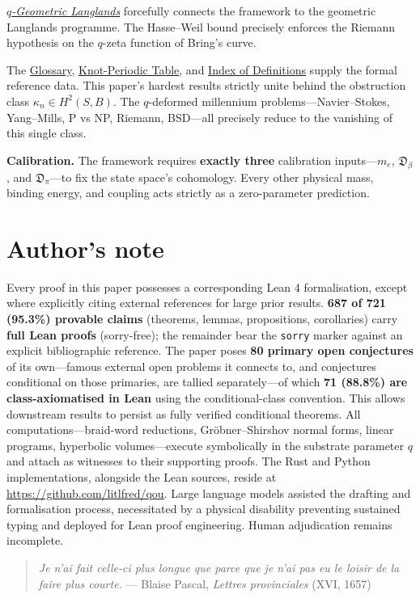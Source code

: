 \hyperref[chap:q-geometric-langlands]{\emph{$q$-Geometric Langlands}} forcefully connects the framework to the geometric Langlands programme. The Hasse–Weil bound precisely enforces the Riemann hypothesis on the $q$-zeta function of Bring's curve.

The \hyperref[chap:glossary]{Glossary}, \hyperref[app:knot-periodic-table]{Knot-Periodic Table}, and \hyperref[app:index-definitions]{Index of Definitions} supply the formal reference data. This paper's hardest results strictly unite behind the obstruction class $\kappa_n \in H^2(S, B)$. The $q$-deformed millennium problems—Navier–Stokes, Yang–Mills, P vs NP, Riemann, BSD—all precisely reduce to the vanishing of this single class.

\textbf{Calibration.}
The framework requires \textbf{exactly three} calibration inputs—$m_e$, $\mathfrak{D}_\beta$, and $\mathfrak{D}_\pi$—to fix the state space's cohomology. Every other physical mass, binding energy, and coupling acts strictly as a zero-parameter prediction.

\section{Author's note}
\label{sec:authors-note}
Every proof in this paper possesses a corresponding Lean 4 formalisation, except where explicitly citing external references for large prior results. \textbf{687 of 721 (95.3\%) provable claims} (theorems, lemmas, propositions, corollaries) carry \textbf{full Lean proofs} (sorry-free); the remainder bear the \texttt{sorry} marker against an explicit bibliographic reference. The paper poses \textbf{80 primary open conjectures} of its own—famous external open problems it connects to, and conjectures conditional on those primaries, are tallied separately—of which \textbf{71 (88.8\%) are class-axiomatised in Lean} using the conditional-class convention. This allows downstream results to persist as fully verified conditional theorems. All computations—braid-word reductions, Gröbner–Shirshov normal forms, linear programs, hyperbolic volumes—execute symbolically in the substrate parameter $q$ and attach as witnesses to their supporting proofs. The Rust and Python implementations, alongside the Lean sources, reside at \href{https://github.com/litlfred/qou}{https://github.com/litlfred/qou}. Large language models assisted the drafting and formalisation process, necessitated by a physical disability preventing sustained typing and deployed for Lean proof engineering. Human adjudication remains incomplete.

\begin{quote}
\emph{Je n'ai fait celle-ci plus longue que parce que je n'ai pas eu le loisir de la faire plus courte.}
— Blaise Pascal, \emph{Lettres provinciales} (XVI, 1657)
\end{quote}

